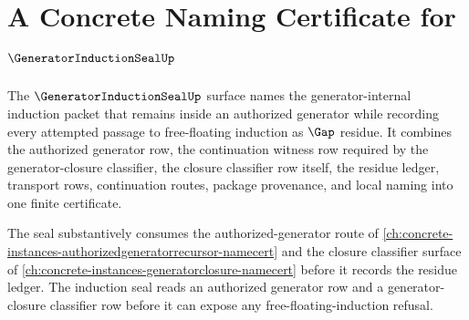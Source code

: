 \chapter{A Concrete Naming Certificate for $\GeneratorInductionSealUp$}
\label{ch:concrete-instances-generatorinductionseal-namecert}

The $\GeneratorInductionSealUp$ surface names the generator-internal induction packet that remains inside an authorized generator while recording every attempted passage to free-floating induction as $\Gap$ residue. It combines the authorized generator row, the continuation witness row required by the generator-closure classifier, the closure classifier row itself, the residue ledger, transport rows, continuation routes, package provenance, and local naming into one finite certificate.

The seal substantively consumes the authorized-generator route of \autoref{ch:concrete-instances-authorizedgeneratorrecursor-namecert} and the closure classifier surface of \autoref{ch:concrete-instances-generatorclosure-namecert} before it records the residue ledger. The induction seal reads an authorized generator row and a generator-closure classifier row before it can expose any free-floating-induction refusal.

